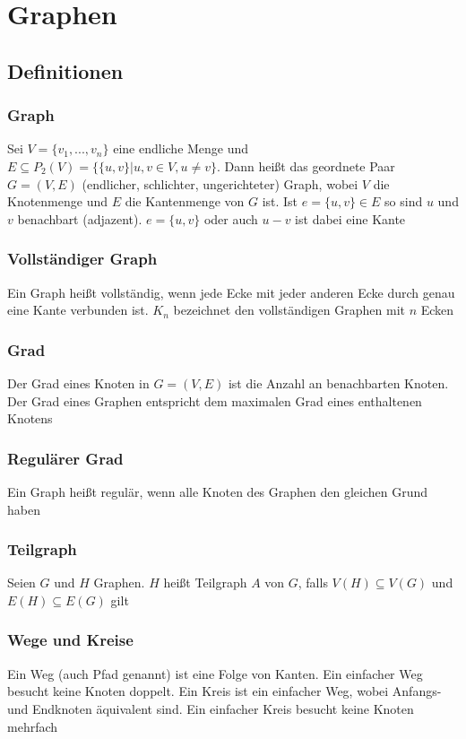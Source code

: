 \section{Graphen}
	\subsection{Definitionen}
	\subsubsection{Graph}
		Sei $V=\{v_1,...,v_n\}$ eine endliche Menge und $E\subseteq P_2(V)=\{\{u,v\}|u,v\in V,u\not = v\}$. Dann heißt das geordnete Paar $G=(V,E)$ (endlicher, schlichter, ungerichteter) Graph, wobei $V$ die Knotenmenge und $E$ die Kantenmenge von $G$ ist. Ist $e=\{u,v\}\in E$ so sind $u$ und $v$ benachbart (adjazent). $e=\{u,v\}$ oder auch $u-v$ ist dabei eine Kante 
	\subsubsection{Vollständiger Graph}
		Ein Graph heißt vollständig, wenn jede Ecke mit jeder anderen Ecke durch genau eine Kante verbunden ist. $K_n$ bezeichnet den vollständigen Graphen mit $n$ Ecken
	\subsubsection{Grad}
		Der Grad eines Knoten in $G=(V,E)$ ist die Anzahl an benachbarten Knoten. Der Grad eines Graphen entspricht dem maximalen Grad eines enthaltenen Knotens
	\subsubsection{Regulärer Grad}
		Ein Graph heißt regulär, wenn alle Knoten des Graphen den gleichen Grund haben
	\subsubsection{Teilgraph}
		Seien $G$ und $H$ Graphen. $H$ heißt Teilgraph $A$ von $G$, falls $V(H)\subseteq V(G)$ und $E(H)\subseteq E(G)$ gilt
	\subsubsection{Wege und Kreise}
		Ein Weg (auch Pfad genannt) ist eine Folge von Kanten. Ein einfacher Weg besucht keine Knoten doppelt. Ein Kreis ist ein einfacher Weg, wobei Anfangs- und Endknoten äquivalent sind. Ein einfacher Kreis besucht keine Knoten mehrfach
		\newpage
